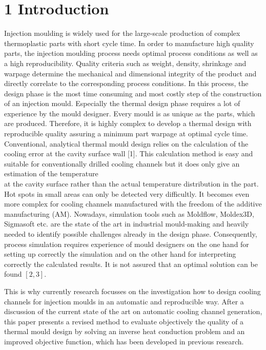 \documentclass[10pt]{article}
\begin{document}
\section*{1 Introduction}
Injection moulding is widely used for the large-scale production of complex thermoplastic parts with short cycle time. In order to manufacture high quality parts, the injection moulding process needs optimal process conditions as well as a high reproducibility. Quality criteria such as weight, density, shrinkage and warpage determine the mechanical and dimensional integrity of the product and directly correlate to the corresponding process conditions. In this process, the design phase is the most time consuming and most costly step of the construction of an injection mould. Especially the thermal design phase requires a lot of experience by the mould designer. Every mould is as unique as the parts, which are produced. Therefore, it is highly complex to develop a thermal design with reproducible quality assuring a minimum part warpage at optimal cycle time. Conventional, analytical thermal mould design relies on the calculation of the cooling error at the cavity surface wall [1]. This calculation method is easy and suitable for conventionally drilled cooling channels but it does only give an estimation of the temperature\\
at the cavity surface rather than the actual temperature distribution in the part. Hot spots in small areas can only be detected very difficultly. It becomes even more complex for cooling channels manufactured with the freedom of the additive manufacturing (AM). Nowadays, simulation tools such as Moldflow, Moldex3D, Sigmasoft etc. are the state of the art in industrial mould-making and heavily needed to identify possible challenges already in the design phase. Consequently, process simulation requires experience of mould designers on the one hand for setting up correctly the simulation and on the other hand for interpreting correctly the calculated results. It is not assured that an optimal solution can be found $[2,3]$.

This is why currently research focusses on the investigation how to design cooling channels for injection moulds in an automatic and reproducible way. After a discussion of the current state of the art on automatic cooling channel generation, this paper presents a revised method to evaluate objectively the quality of a thermal mould design by solving an inverse heat conduction problem and an improved objective function, which has been developed in previous research.
\end{document}
